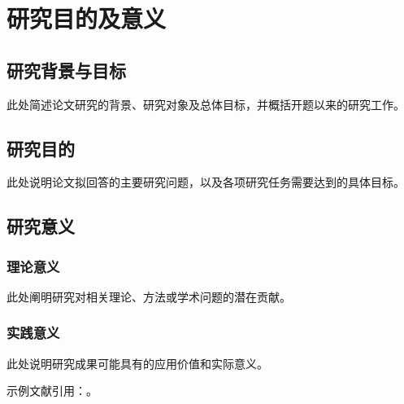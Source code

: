 \chapter{研究目的及意义}

\section{研究背景与目标}
此处简述论文研究的背景、研究对象及总体目标，并概括开题以来的研究工作。

\section{研究目的}
此处说明论文拟回答的主要研究问题，以及各项研究任务需要达到的具体目标。

\section{研究意义}
\subsection{理论意义}
此处阐明研究对相关理论、方法或学术问题的潜在贡献。

\subsection{实践意义}
此处说明研究成果可能具有的应用价值和实际意义。

示例文献引用：\cite{latexproject}。

